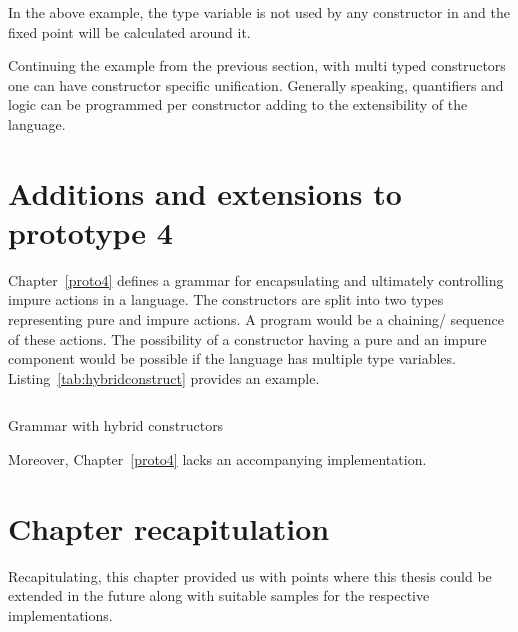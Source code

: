 \documentclass[thesis-solanki.tex]{subfiles}
\begin{document}
In the above example, the  type variable is not used by any constructor in
 and the fixed point will be calculated around it.

Continuing the example from the previous section, with multi typed constructors one can have constructor specific
unification.
Generally speaking, quantifiers and logic can be programmed per constructor adding to the extensibility of the
language.

\section{Additions and extensions to prototype 4}
Chapter~\ref{proto4} defines a grammar for encapsulating and ultimately controlling impure actions in a language.
The constructors are split into two types representing pure and impure actions.
A program would be a chaining/ sequence of these actions.
The possibility of a constructor having a pure and an impure component would be possible if the language has
multiple type variables.
Listing~\ref{tab:hybridconstruct} provides an example.


\begin{code-list}[H]
\begin{singlespace}
\inputminted{haskell}{haskell-proto4-hybrid-construct.hs}
\end{singlespace}
\caption{Grammar with hybrid constructors}
\label{tab:hybridconstruct}
\end{code-list}

Moreover, Chapter~\ref{proto4} lacks an accompanying implementation.

\section{Chapter recapitulation}
Recapitulating, this chapter provided us with points where this thesis could be extended in the future along with
suitable samples for the respective implementations.


\ifMain\ifDraft
\begin{scope}
  \nolinenumbers
  \enotesize
  \par
  \begin{singlespace}
  \setlength{\parskip}{12pt plus 2pt minus 1pt}
  \theendnotes
  \par
  \end{singlespace}
\end{scope}
\fi\fi
\end{document}

